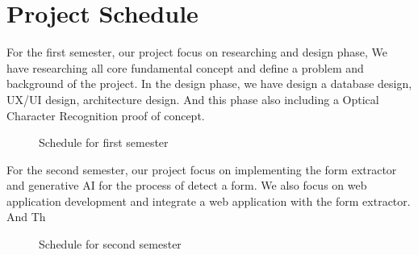 \documentclass[12pt,oneside,openright,a4paper]{cpe-english-project}
\begin{document}
\section{Project Schedule}
For the first semester, our project focus on researching and design phase, We have researching all core fundamental concept and define a problem and background of the project. In the design phase, we have design a database design, UX/UI design, architecture design. And this phase also including a Optical Character Recognition proof of concept.

\begin{figure}[!h]
\centering
{}
\caption{Schedule for first semester}\label{fig:chart-figure-5}
\end{figure}

For the second semester, our project focus on implementing the form extractor and generative AI for the process of detect a form. We also focus on web application development and integrate a web application with the form extractor. And Th

\begin{figure}[!h]
\centering
{}
\caption{Schedule for second semester}\label{fig:chart-figure-5}
\end{figure}
\end{document}
